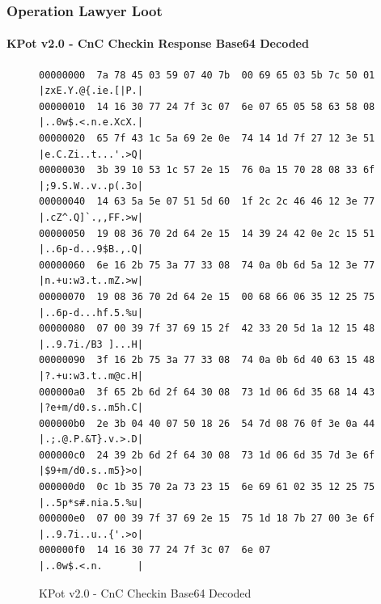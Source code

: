 \documentclass[aspectratio=169]{beamer}
\begin{document}
{
\begin{frame}[fragile]
  \frametitle{Operation Lawyer Loot}
  \framesubtitle{KPot v2.0 - CnC Checkin Response Base64 Decoded}
\begin{figure}
\footnotesize{
\begin{verbatim}
00000000  7a 78 45 03 59 07 40 7b  00 69 65 03 5b 7c 50 01  |zxE.Y.@{.ie.[|P.|
00000010  14 16 30 77 24 7f 3c 07  6e 07 65 05 58 63 58 08  |..0w$.<.n.e.XcX.|
00000020  65 7f 43 1c 5a 69 2e 0e  74 14 1d 7f 27 12 3e 51  |e.C.Zi..t...'.>Q|
00000030  3b 39 10 53 1c 57 2e 15  76 0a 15 70 28 08 33 6f  |;9.S.W..v..p(.3o|
00000040  14 63 5a 5e 07 51 5d 60  1f 2c 2c 46 46 12 3e 77  |.cZ^.Q]`.,,FF.>w|
00000050  19 08 36 70 2d 64 2e 15  14 39 24 42 0e 2c 15 51  |..6p-d...9$B.,.Q|
00000060  6e 16 2b 75 3a 77 33 08  74 0a 0b 6d 5a 12 3e 77  |n.+u:w3.t..mZ.>w|
00000070  19 08 36 70 2d 64 2e 15  00 68 66 06 35 12 25 75  |..6p-d...hf.5.%u|
00000080  07 00 39 7f 37 69 15 2f  42 33 20 5d 1a 12 15 48  |..9.7i./B3 ]...H|
00000090  3f 16 2b 75 3a 77 33 08  74 0a 0b 6d 40 63 15 48  |?.+u:w3.t..m@c.H|
000000a0  3f 65 2b 6d 2f 64 30 08  73 1d 06 6d 35 68 14 43  |?e+m/d0.s..m5h.C|
000000b0  2e 3b 04 40 07 50 18 26  54 7d 08 76 0f 3e 0a 44  |.;.@.P.&T}.v.>.D|
000000c0  24 39 2b 6d 2f 64 30 08  73 1d 06 6d 35 7d 3e 6f  |$9+m/d0.s..m5}>o|
000000d0  0c 1b 35 70 2a 73 23 15  6e 69 61 02 35 12 25 75  |..5p*s#.nia.5.%u|
000000e0  07 00 39 7f 37 69 2e 15  75 1d 18 7b 27 00 3e 6f  |..9.7i..u..{'.>o|
000000f0  14 16 30 77 24 7f 3c 07  6e 07                    |..0w$.<.n.      |
\end{verbatim}
}
\caption{KPot v2.0 - CnC Checkin Base64 Decoded}
\end{figure}
\end{frame}
}
\end{document}
